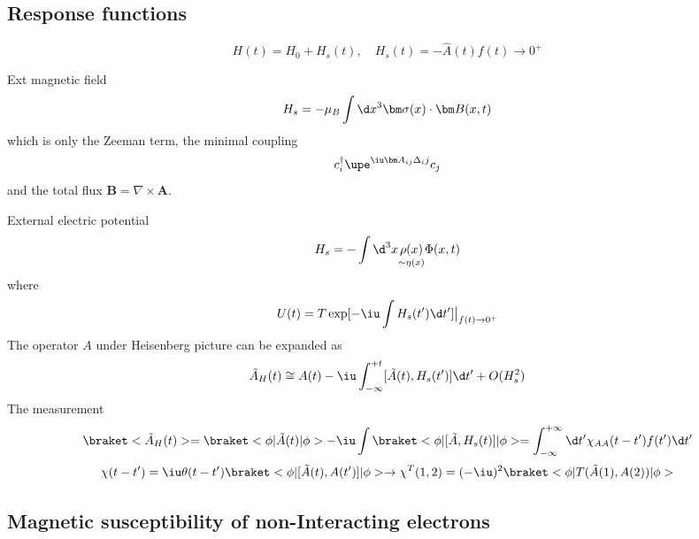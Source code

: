 \subsection{Response functions}

\[
  H(t) = H_0 + H_s(t), \quad H_s(t) = -\hat A(t) f(t) \to 0^+
\]
\begin{example}
  \begin{enumext}
    \item Ext magnetic field
    \[
      H_s = -\mu_B \int \d x^3 \bm\sigma(x) \cdot \bm B(x,t)
    \]
    which is only the Zeeman term, the minimal coupling
    \[
      c_i^\dagger \upe^{\iu\bm A_{ij}\Delta_ij} c_j
    \]
    and the total flux $\bm B = \nabla \times \bm A$.
    \item External electric potential
    \[
      H_s = -\int \d^3 x \underset{\sim \eta(x)}{\rho(x)} \Phi(x,t)
    \]
    where
    \[
      U(t) = T\exp[-\iu\int H_s(t') \d t'] \big|_{f(t) \to 0^+}
    \]
    The operator $A$ under Heisenberg picture can be expanded as
    \[
      \tilde A_H(t) \cong A(t) - \iu \int_{-\infty}^{+t}
        [\tilde A(t), H_s(t')] \d t' + O(H_s^2)
    \]
    The measurement
    \[
      \braket<\tilde A_H(t)>
    = \braket<\phi|\tilde A(t)|\phi>
    - \iu \int \braket<\phi|[\tilde A, H_s(t)]|\phi>
    = \int_{-\infty}^{+\infty} \d t' \chi_{AA}(t - t') f(t') \d t'
    \]
    \[
      \chi(t - t') = \iu\theta(t - t') \braket<\phi|[\tilde A(t), A(t')]|\phi>
      \to
      \chi^T(1,2) = (-\iu)^2 \braket<\phi|T(\tilde A(1), A(2))|\phi>
    \]
  \end{enumext}
\end{example}

\subsection{Magnetic susceptibility of non-Interacting electrons}

